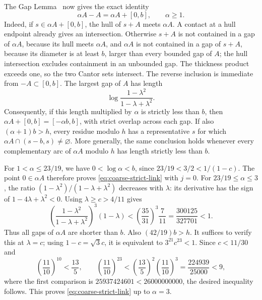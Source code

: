 The Gap Lemma~\cite{Newhouse1979} now gives the exact identity
\begin{equation}\label{eq:coarse-thickening}
 \alpha A-A=\alpha A+[0,b],\qquad \alpha\ge1.
\end{equation}
Indeed, if $s\in\alpha A+[0,b]$, the hull of $s+A$ meets $\alpha A$.
A contact at a hull endpoint already gives an intersection.
Otherwise $s+A$ is not contained in a gap of $\alpha A$, because its hull
meets $\alpha A$, and $\alpha A$ is not contained in a gap of $s+A$,
because its diameter is at least $b$, larger than every bounded gap of $A$;
the hull intersection excludes containment in an unbounded gap.
The thickness product exceeds one, so the two Cantor sets intersect.
The reverse inclusion is immediate from $-A\subset[0,b]$.
The largest gap of $A$ has length
\[
 \log\frac{1-\lambda^2}{1-\lambda+\lambda^2}.
\]
Consequently, if this length multiplied by $\alpha$ is strictly less than
$b$, then $\alpha A+[0,b]=[-\alpha b,b]$, with strict overlap across each
gap. If also $(\alpha+1)b>h$, every residue modulo $h$ has a representative
$s$ for which $\alpha A\cap(s-b,s)\ne\varnothing$.
More generally, the same conclusion holds whenever every complementary arc
of $\alpha A$ modulo $h$ has length strictly less than $b$.

For $1<\alpha\le23/19$, we have
$0<\log\alpha<b$, since $23/19<3/2<1/(1-c)$.
The point $0\in\alpha A$ therefore proves
\eqref{eq:coarse-strict-link} with $j=0$.
For $23/19\le\alpha\le3$, the ratio
$(1-\lambda^2)/(1-\lambda+\lambda^2)$ decreases with $\lambda$:
its derivative has the sign of $1-4\lambda+\lambda^2<0$.
Using $\lambda\ge c>4/11$ gives
\[
 \left(\frac{1-\lambda^2}{1-\lambda+\lambda^2}\right)^3(1-\lambda)
 <\left(\frac{35}{31}\right)^3\frac7{11}
 =\frac{300125}{327701}<1.
\]
Thus all gaps of $\alpha A$ are shorter than $b$.
Also $(42/19)b>h$. It suffices to verify this at $\lambda=c$;
using $1-c=\sqrt3c$, it is equivalent to $3^{21}c^{23}<1$.
Since $c<11/30$ and
\[
 \left(\frac{11}{10}\right)^{10}<\frac{13}{5},\qquad
 \left(\frac{11}{10}\right)^{23}
 <\left(\frac{13}{5}\right)^2\left(\frac{11}{10}\right)^3
 =\frac{224939}{25000}<9,
\]
where the first comparison is $25937424601<26000000000$, the desired
inequality follows. This proves \eqref{eq:coarse-strict-link} up to $\alpha=3$.

